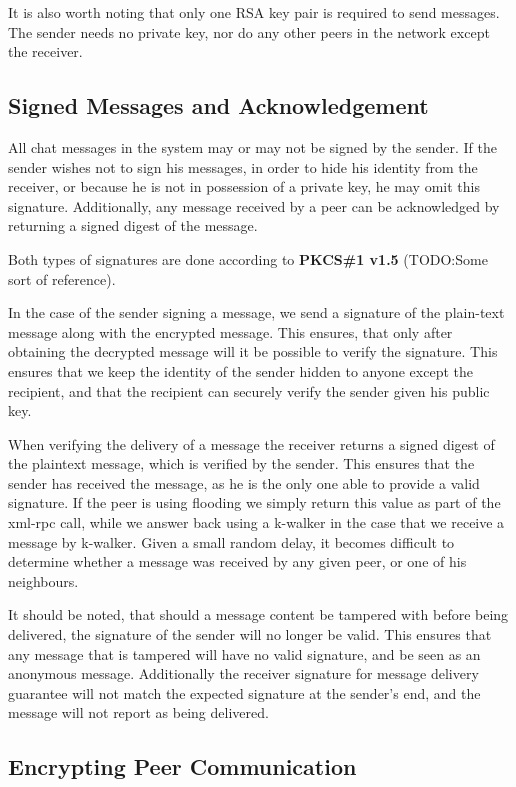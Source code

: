 It is also worth noting that only one RSA key pair is required to send messages. The sender needs no private key, nor do any other peers in the network except the receiver.

\subsection{Signed Messages and Acknowledgement}

All chat messages in the system may or may not be signed by the sender. If the sender wishes not to sign his messages, in order to hide his identity from the receiver, or because he is not in possession of a private key, he may omit this signature. Additionally, any message received by a peer can be acknowledged by returning a signed digest of the message.

Both types of signatures are done according to \textbf{PKCS\#1 v1.5} (TODO:Some sort of reference).

In the case of the sender signing a message, we send a signature of the plain-text message along with the encrypted message. This ensures, that only after obtaining the decrypted message will it be possible to verify the signature. This ensures that we keep the identity of the sender hidden to anyone except the recipient, and that the recipient can securely verify the sender given his public key.

When verifying the delivery of a message the receiver returns a signed digest of the plaintext message, which is verified by the sender. This ensures that the sender has received the message, as he is the only one able to provide a valid signature. If the peer is using flooding we simply return this value as part of the xml-rpc call, while we answer back using a k-walker in the case that we receive a message by k-walker. Given a small random delay, it becomes difficult to determine whether a message was received by any given peer, or one of his neighbours. 

It should be noted, that should a message content be tampered with before being delivered, the signature of the sender will no longer be valid. This ensures that any message that is tampered will have no valid signature, and be seen as an anonymous message.
Additionally the receiver signature for message delivery guarantee will not match the expected signature at the sender's end, and the message will not report as being delivered.
 
\subsection{Encrypting Peer Communication}

